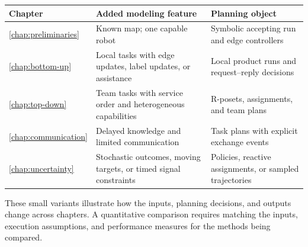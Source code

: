 \begin{revision}
\begin{center}
\small
\begin{tabularx}{\textwidth}{p{}XX}
\toprule
Chapter & Added modeling feature & Planning object \\
\midrule
\ref{chap:preliminaries} & Known map; one capable robot & Symbolic accepting run and edge controllers \\
\ref{chap:bottom-up} & Local tasks with edge updates, label updates, or assistance & Local product runs and request--reply decisions \\
\ref{chap:top-down} & Team tasks with service order and heterogeneous capabilities & R-posets, assignments, and team plans \\
\ref{chap:communication} & Delayed knowledge and limited communication & Task plans with explicit exchange events \\
\ref{chap:uncertainty} & Stochastic outcomes, moving targets, or timed signal constraints & Policies, reactive assignments, or sampled trajectories \\
\bottomrule
\end{tabularx}
\end{center}
These small variants illustrate how the inputs, planning decisions, and
outputs change across chapters. A quantitative comparison requires matching
the inputs, execution assumptions, and performance measures for the
methods being compared.
\end{revision}
